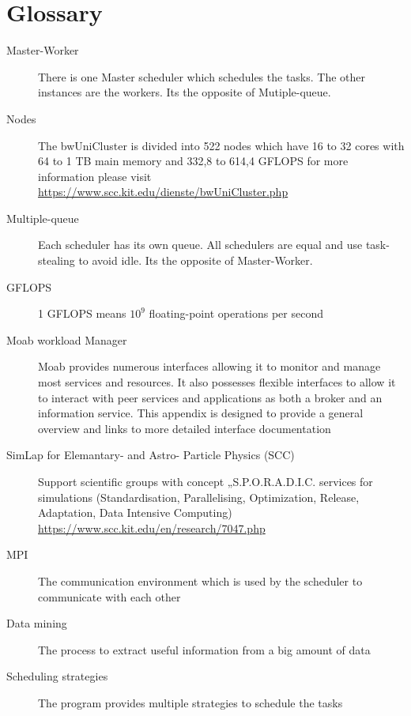 \section{Glossary}
\begin{description}
	\item[Master-Worker] There is one Master scheduler which schedules the tasks. The other instances are the workers. Its the opposite of Mutiple-queue.

	\item[Nodes] The bwUniCluster is divided into 522 nodes which have 16 to 32 cores with 64 to 1 TB main memory and 332,8 to 614,4 GFLOPS for more information please visit \href{https://www.scc.kit.edu/dienste/bwUniCluster.php}{https://www.scc.kit.edu/dienste/bwUniCluster.php}

	\item[Multiple-queue]Each scheduler has its own queue. All schedulers are equal and use task-stealing to avoid idle. Its the opposite of Master-Worker.

	\item[GFLOPS] 1 GFLOPS means $10^9$ floating-point operations per second

	\item[Moab workload Manager] Moab provides numerous interfaces allowing it to monitor and manage most services and resources. It also possesses flexible interfaces to allow it to interact with peer services and applications as both a broker and an information service. This appendix is designed to provide a general overview and links to more detailed interface documentation

	\item [SimLap for Elemantary- and Astro-    Particle Physics (SCC)] Support scientific groups with concept „S.P.O.R.A.D.I.C. services for simulations (Standardisation, Parallelising, Optimization, Release, Adaptation, Data Intensive Computing) \href {https://www.scc.kit.edu/en/research/7047.php}{https://www.scc.kit.edu/en/research/7047.php}

	\item[MPI] The communication environment which is used by the scheduler to communicate with each other 

	\item[Data mining] The process to extract useful information from a big amount of data

	\item[Scheduling strategies] The program provides multiple strategies to schedule the tasks


\end{description}
